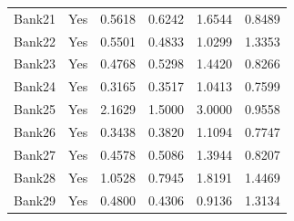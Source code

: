 \begin{longtable}{@{}lcrrrr@{}}
Bank21 & Yes & 0.5618 & 0.6242 & 1.6544 & 0.8489 \\
Bank22 & Yes & 0.5501 & 0.4833 & 1.0299 & 1.3353 \\
Bank23 & Yes & 0.4768 & 0.5298 & 1.4420 & 0.8266 \\
Bank24 & Yes & 0.3165 & 0.3517 & 1.0413 & 0.7599 \\
Bank25 & Yes & 2.1629 & 1.5000 & 3.0000 & 0.9558 \\
Bank26 & Yes & 0.3438 & 0.3820 & 1.1094 & 0.7747 \\
Bank27 & Yes & 0.4578 & 0.5086 & 1.3944 & 0.8207 \\
Bank28 & Yes & 1.0528 & 0.7945 & 1.8191 & 1.4469 \\
Bank29 & Yes & 0.4800 & 0.4306 & 0.9136 & 1.3134 \\
\end{longtable}

